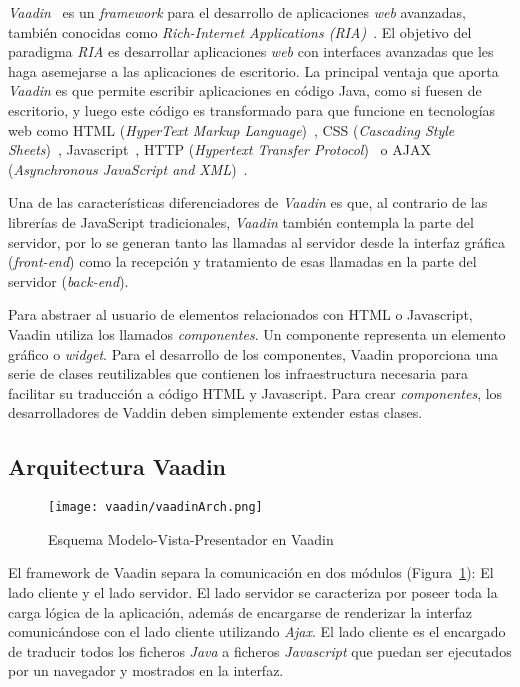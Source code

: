 

\emph{Vaadin}~\cite{vaadin} es un \emph{framework} para el desarrollo de aplicaciones \emph{web} avanzadas, también conocidas como \emph{Rich-Internet Applications (RIA)}~\cite{ria}. El objetivo del paradigma \emph{RIA} es desarrollar aplicaciones \emph{web} con interfaces avanzadas que les haga asemejarse a las aplicaciones de escritorio. La principal ventaja que aporta \emph{Vaadin} es que permite escribir aplicaciones en código Java, como si fuesen de escritorio, y luego este código es transformado para que funcione en tecnologías web como HTML (\emph{HyperText Markup Language})~\cite{html}, CSS (\emph{Cascading Style Sheets})~\cite{css}, Javascript~\cite{javascript}, HTTP (\emph{Hypertext Transfer Protocol})~\cite{http} o AJAX (\emph{Asynchronous JavaScript and XML})~\cite{ajax}.

Una de las características diferenciadores de \emph{Vaadin} es que, al contrario de las librerías de JavaScript tradicionales, \emph{Vaadin} también contempla la parte del servidor, por lo se generan tanto las llamadas al servidor desde la interfaz gráfica (\emph{front-end}) como la recepción y tratamiento de esas llamadas en la parte del servidor (\emph{back-end}).

Para abstraer al usuario de elementos relacionados con HTML o Javascript, Vaadin utiliza los llamados \emph{componentes}. Un componente representa un elemento gráfico o \emph{widget}. Para el desarrollo de los componentes, Vaadin proporciona una serie de clases reutilizables que contienen los infraestructura necesaria para facilitar su traducción a código HTML y Javascript. Para crear \emph{componentes}, los desarrolladores de Vaddin deben simplemente extender estas clases.



\subsection{Arquitectura Vaadin}

\begin{figure}
	\centering
	\texttt{[image: vaadin/vaadinArch.png]}
	\caption{Esquema Modelo-Vista-Presentador en Vaadin}
	\label{fig:vaadinMVP}
\end{figure}

El framework de Vaadin\cite{vaadinArch} separa la comunicación en dos módulos (Figura~\ref{fig:vaadinMVP}): El lado cliente y el lado servidor. El lado servidor se caracteriza por poseer toda la carga lógica de la aplicación, además de encargarse de renderizar la interfaz comunicándose con el lado cliente utilizando \emph{Ajax}\cite{ajax}. El lado cliente es el encargado de traducir todos los ficheros \emph{Java} a ficheros \emph{Javascript} que puedan ser ejecutados por un navegador y mostrados en la interfaz.

